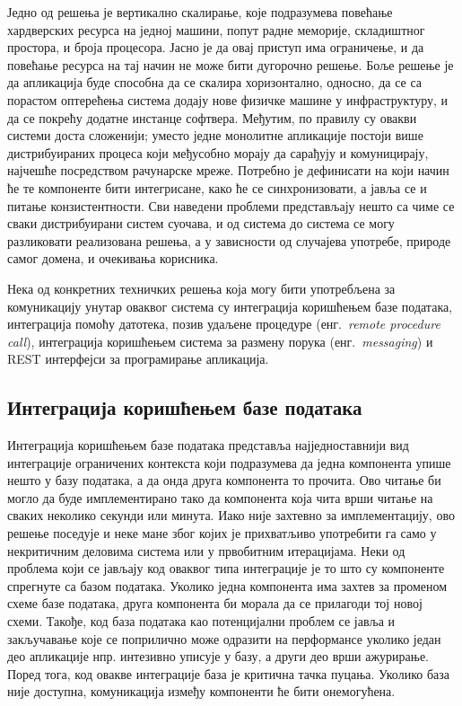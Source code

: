 \documentclass[12pt,oneside]{memoir}
\begin{document}
Једно од решења је вертикално скалирање, које подразумева повећање хардверских ресурса на једној машини, попут радне меморије, складиштног простора, и броја процесора. Јасно је да овај приступ има ограничење, и да повећање ресурса на тај начин не може бити дугорочно решење. Боље решење је да апликација буде способна да се скалира хоризонтално, односно, да се са порастом оптерећења система додају нове физичке машине у инфраструктуру, и да се покрећу додатне инстанце софтвера. Међутим, по правилу су овакви системи доста сложенији; уместо једне монолитне апликације постоји више дистрибуираних процеса који међусобно морају да сарађују и комуницирају, најчешће посредством рачунарске мреже. Потребно је дефинисати на који начин ће те компоненте бити интегрисане, како ће се синхронизовати, а јавља се и питање конзистентности. Сви наведени проблеми представљају нешто са чиме се сваки дистрибуирани систем суочава, и од система до система се могу разликовати реализована решења, а у зависности од случајева употребе, природе самог домена, и очекивања корисника.

Нека од конкретних техничких решења која могу бити употребљена за комуникацију унутар оваквог система су интеграција коришћењем базе података, интеграција помоћу датотека, позив удаљене процедуре (енг.~\textit{remote procedure call}), интеграција коришћењем система за размену порука (енг.~\textit{messaging}) и REST интерфејси за програмирање апликација.

\subsection{Интеграција коришћењем базе података}
Интеграција коришћењем базе података представља најједноставнији вид интеграције ограничених контекста који подразумева да једна компонента упише нешто у базу података, а да онда друга компонента то прочита. Ово читање би могло да буде имплементирано тако да компонента која чита врши читање на сваких неколико секунди или минута. Иако није захтевно за имплементацију, ово решење поседује и неке мане због којих је прихватљиво употребити га само у некритичним деловима система или у првобитним итерацијама. Неки од проблема који се јављају код оваквог типа интеграције је то што су компоненте спрегнуте са базом података. Уколико једна компонента има захтев за променом схеме базе података, друга компонента би морала да се прилагоди тој новој схеми. Такође, код база података као потенцијални проблем се јавља и закључавање које се поприлично може одразити на перформансе уколико један део апликације нпр. интезивно уписује у базу, а други део врши ажурирање. Поред тога, код овакве интеграције база је критична тачка пуцања. Уколико база није доступна, комуникација између компоненти ће бити онемогућена. 
\end{document}
